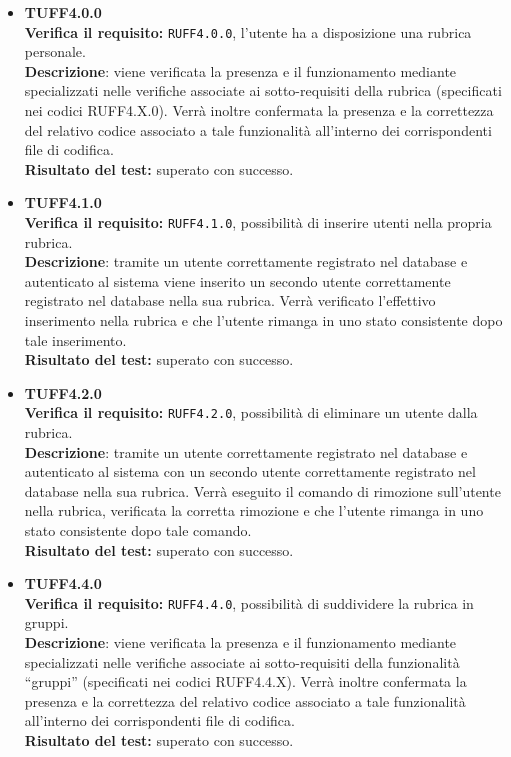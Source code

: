 \begin{itemize}
\item \textbf{TUFF4.0.0}\\
\textbf{Verifica il requisito:} \texttt{RUFF4.0.0}, l'utente ha a disposizione una rubrica personale.\\
\textbf{Descrizione}: viene verificata la presenza e il funzionamento mediante  specializzati nelle verifiche associate ai sotto-requisiti della rubrica (specificati nei codici RUFF4.X.0). Verrà inoltre confermata la presenza e la correttezza del relativo codice associato a tale funzionalità all'interno dei corrispondenti file di codifica.\\
\textbf{Risultato del test:} superato con successo.

\item \textbf{TUFF4.1.0}\\
\textbf{Verifica il requisito:} \texttt{RUFF4.1.0}, possibilità di inserire utenti nella propria rubrica.\\
\textbf{Descrizione}: tramite un utente  correttamente registrato nel database e autenticato al sistema viene inserito un secondo utente  correttamente registrato nel database nella sua rubrica. Verrà verificato l'effettivo inserimento nella rubrica e che l'utente rimanga in uno stato consistente dopo tale inserimento.\\
\textbf{Risultato del test:} superato con successo.

\item \textbf{TUFF4.2.0}\\
\textbf{Verifica il requisito:} \texttt{RUFF4.2.0}, possibilità di eliminare un utente dalla rubrica.\\
\textbf{Descrizione}: tramite un utente  correttamente registrato nel database e autenticato al sistema con un secondo utente  correttamente registrato nel database nella sua rubrica. Verrà eseguito il comando di rimozione sull'utente nella rubrica, verificata la corretta rimozione e che l'utente rimanga in uno stato consistente dopo tale comando.\\
\textbf{Risultato del test:} superato con successo.

\item \textbf{TUFF4.4.0}\\
\textbf{Verifica il requisito:} \texttt{RUFF4.4.0}, possibilità di suddividere la rubrica in gruppi.\\
\textbf{Descrizione}: viene verificata la presenza e il funzionamento mediante  specializzati nelle verifiche associate ai sotto-requisiti della funzionalità ``gruppi'' (specificati nei codici RUFF4.4.X). Verrà inoltre confermata la presenza e la correttezza del relativo codice associato a tale funzionalità all'interno dei corrispondenti file di codifica.\\
\textbf{Risultato del test:} superato con successo.


\end{itemize}
